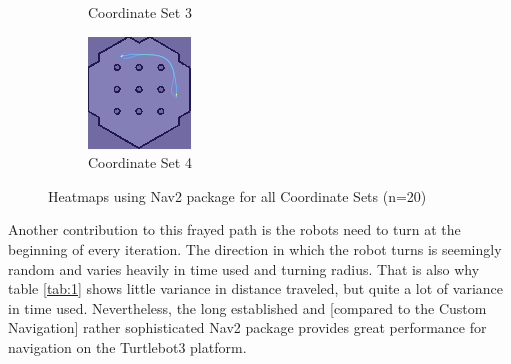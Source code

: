 \documentclass[%
paper=A4,               %
twoside=true,           %
openright,              %
11pt,                   %
bibliography=totoc,     %
titlepage=on,           %
DIV=12,                 %
BCOR=1.5cm,             %
parskip=half,            %
final
]{scrreprt}
\begin{document}
\begin{figure}[H]
\begin{subfigure}[b]{0.45\textwidth}
			\caption{Coordinate Set 3}
			\label{fig:fig12}
		\end{subfigure}
		\hfill
		\begin{subfigure}[b]{0.45\textwidth}
			\centering
			\includegraphics[width=\textwidth]{Graphics/heatmapsim4.png}
			\caption{Coordinate Set 4}
			\label{fig:fig13}
		\end{subfigure}
		\caption{Heatmaps using Nav2 package for all Coordinate Sets (n=20)}
		\label{fig:heatmaps}
	\end{figure}
	
	Another contribution to this frayed path is the robots need to turn at the beginning of every iteration. The direction in which the robot turns is seemingly random and varies heavily in time used and turning radius. That is also why table \ref{tab:1} shows little variance in distance traveled, but quite a lot of variance in time used. \newline 
	Nevertheless, the long established and [compared to the Custom Navigation] rather sophisticated Nav2 package provides great performance for navigation on the Turtlebot3 platform.  
	
		

	
	
\end{document}
